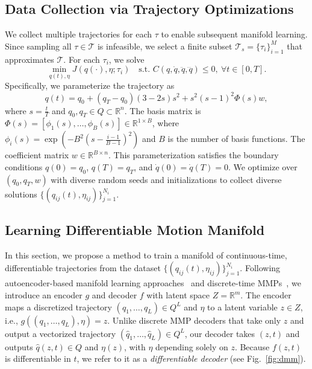 \subsection{Data Collection via Trajectory Optimizations}
\label{sec:A}
We collect multiple trajectories for each $\tau$ to enable subsequent manifold learning.  
Since sampling all $\tau \in \mathcal{T}$ is infeasible, we select a finite subset $\mathcal{T}_s=\{\tau_i\}_{i=1}^M$ that approximates $\mathcal{T}$.  
For each $\tau_i$, we solve
\begin{equation}
\min_{q(t),\eta} J(q(\cdot),\eta;\tau_i) \quad 
\text{s.t. } C(q,\dot q,\ddot q,\dddot q)\le0,\ \forall t\!\in[0,T].
\end{equation}
Specifically, we parameterize the trajectory as
\begin{equation}
\label{eq:parmetric_model}
q(t)=q_0+(q_T-q_0)(3-2s)s^2+s^2(s-1)^2\Phi(s)w,
\end{equation}
where $s=\tfrac{t}{T}$ and $q_0,q_T\in Q\subset\mathbb{R}^n$. 
The basis matrix is $\Phi(s)=[\phi_1(s), \ldots, \phi_{B}(s)] \in \mathbb{R}^{1\times B}$, where $\phi_i(s) = \exp(-B^2(s-\frac{i-1}{B-1})^2)$ and $B$ is the number of basis functions. The coefficient matrix $w\in\mathbb{R}^{B\times n}$. 
This parameterization satisfies the boundary conditions $q(0)=q_0$, $q(T)=q_T$, and $\dot q(0)=\dot q(T)=0$.  
We optimize over $(q_0,q_T,w)$ with diverse random seeds and initializations to collect diverse solutions $\{(q_{ij}(t),\eta_{ij})\}_{j=1}^{N_i}$.

\subsection{Learning Differentiable Motion Manifold}
\label{sec:B}
In this section, we propose a method to train a manifold of continuous-time, differentiable trajectories from the dataset $\{(q_{ij}(t),\eta_{ij})\}_{j=1}^{N_i}$.  
Following autoencoder-based manifold learning approaches~\cite{arvanitidis2017latent,lee2021neighborhood,yonghyeon2022regularized,lee2023explicit} and discrete-time MMPs~\cite{lee2023equivariant,lee2025motion}, we introduce an encoder $g$ and decoder $f$ with latent space $Z=\mathbb{R}^m$.  
The encoder maps a discretized trajectory $(q_1,\ldots,q_L)\in Q^L$ and $\eta$ to a latent variable $z\in Z$, i.e., $g((q_1,\ldots,q_L),\eta)=z$.  
Unlike discrete MMP decoders that take only $z$ and output a vectorized trajectory $(\hat{q}_1,\ldots,\hat{q}_L) \in Q^L$, our decoder takes $(z,t)$ and outputs $\hat q(z,t) \in Q$ and $\eta(z)$, with $\eta$ depending solely on $z$.  
Because $f(z,t)$ is differentiable in $t$, we refer to it as a \emph{differentiable decoder} (see Fig.~\ref{fig:dmm}).


